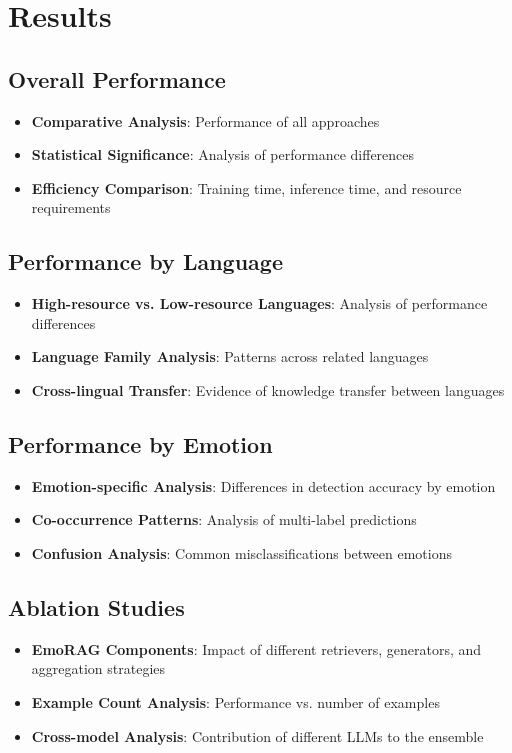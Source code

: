\documentclass[a4paper,12pt]{extarticle}
\begin{document}
\section{Results}

\subsection{Overall Performance}
\begin{itemize}
\item \textbf{Comparative Analysis}: Performance of all approaches
\item \textbf{Statistical Significance}: Analysis of performance differences
\item \textbf{Efficiency Comparison}: Training time, inference time, and resource requirements
\end{itemize}

\subsection{Performance by Language}
\begin{itemize}
\item \textbf{High-resource vs. Low-resource Languages}: Analysis of performance differences
\item \textbf{Language Family Analysis}: Patterns across related languages
\item \textbf{Cross-lingual Transfer}: Evidence of knowledge transfer between languages
\end{itemize}

\subsection{Performance by Emotion}
\begin{itemize}
\item \textbf{Emotion-specific Analysis}: Differences in detection accuracy by emotion
\item \textbf{Co-occurrence Patterns}: Analysis of multi-label predictions
\item \textbf{Confusion Analysis}: Common misclassifications between emotions
\end{itemize}

\subsection{Ablation Studies}
\begin{itemize}
\item \textbf{EmoRAG Components}: Impact of different retrievers, generators, and aggregation strategies
\item \textbf{Example Count Analysis}: Performance vs. number of examples
\item \textbf{Cross-model Analysis}: Contribution of different LLMs to the ensemble
\end{itemize}
\end{document}
